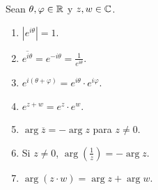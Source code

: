 \begin{prop}
Sean $\displaystyle \theta, \varphi \in \mathbb{R} $ y $\displaystyle z,w \in \mathbb{C} $. 
\begin{enumerate}
\item $\displaystyle \left|e^{i\theta }\right|=1 $.
\item $\displaystyle \overline{e^{i\theta }}=e^{-i\theta }=\frac{1}{e^{i\theta}} $. 
\item $\displaystyle e^{i\left(\theta + \varphi\right)}=e^{i\theta } \cdot e^{i\varphi} $.
\item $\displaystyle e^{z + w}=e^{z} \cdot e^{w} $. 
\item $\displaystyle \arg \overline{z} = - \arg z $ para $\displaystyle z \neq 0 $. 
\item Si $\displaystyle z \neq 0 $, $\displaystyle \arg\left(\frac{1}{z}\right)=-\arg z $.
\item $\displaystyle \arg\left(z \cdot w\right)=\arg z + \arg w $. 
\end{enumerate}
\end{prop}
